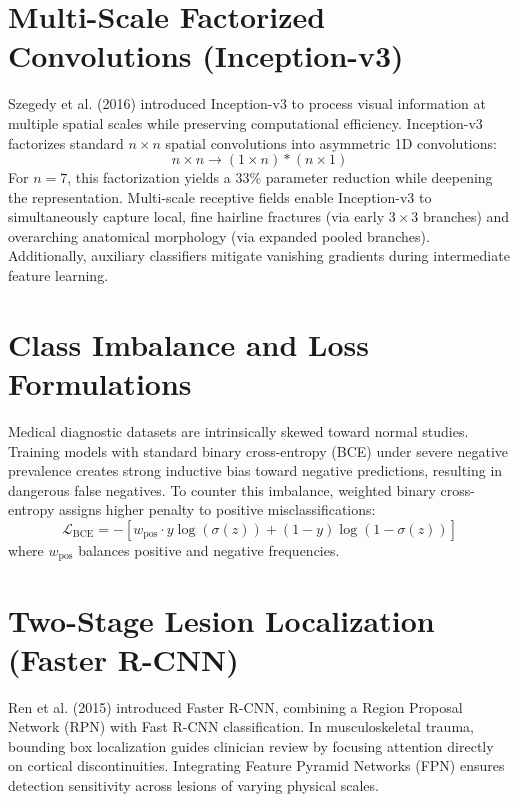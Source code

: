 \documentclass[12pt, a4paper]{report}
\begin{document}
\section{Multi-Scale Factorized Convolutions (Inception-v3)}
Szegedy et al. (2016) introduced Inception-v3 to process visual information at multiple spatial scales while preserving computational efficiency. Inception-v3 factorizes standard $n\times n$ spatial convolutions into asymmetric 1D convolutions:
\begin{equation}
    n \times n \longrightarrow (1 \times n) \ast (n \times 1)
\end{equation}
For $n=7$, this factorization yields a $33\%$ parameter reduction while deepening the representation. Multi-scale receptive fields enable Inception-v3 to simultaneously capture local, fine hairline fractures (via early $3\times 3$ branches) and overarching anatomical morphology (via expanded pooled branches). Additionally, auxiliary classifiers mitigate vanishing gradients during intermediate feature learning.

\section{Class Imbalance and Loss Formulations}
Medical diagnostic datasets are intrinsically skewed toward normal studies. Training models with standard binary cross-entropy (BCE) under severe negative prevalence creates strong inductive bias toward negative predictions, resulting in dangerous false negatives. To counter this imbalance, weighted binary cross-entropy assigns higher penalty to positive misclassifications:
\begin{equation}
    \mathcal{L}_{\text{BCE}} = - \left[ w_{\text{pos}} \cdot y \log(\sigma(z)) + (1 - y) \log(1 - \sigma(z)) \right]
\end{equation}
where $w_{\text{pos}}$ balances positive and negative frequencies.

\section{Two-Stage Lesion Localization (Faster R-CNN)}
Ren et al. (2015) introduced Faster R-CNN, combining a Region Proposal Network (RPN) with Fast R-CNN classification. In musculoskeletal trauma, bounding box localization guides clinician review by focusing attention directly on cortical discontinuities. Integrating Feature Pyramid Networks (FPN) ensures detection sensitivity across lesions of varying physical scales.
\end{document}
